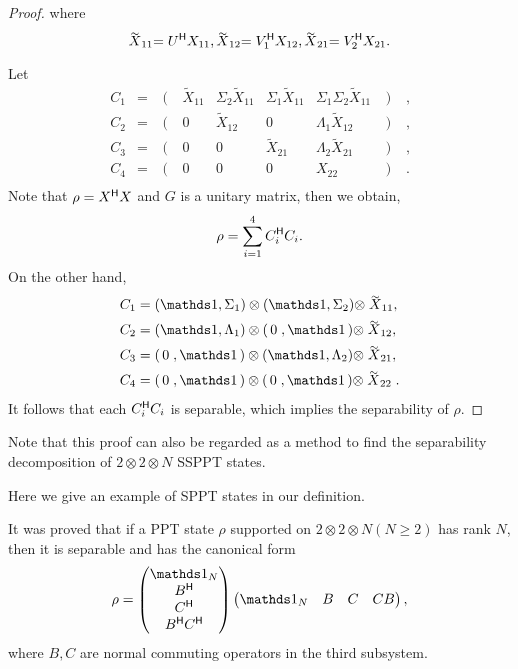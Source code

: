 \begin{proof}
  where
  \begin{equation}
    \label{eq:23p}
    \tilde X_{11} =  \adj U X_{11}, \tilde X_{12} =  \adj V_1 X_{12}, \tilde X_{21} =  \adj V_2 X_{21}.   
  \end{equation}
  
  Let
  \begin{equation*}
    \begin{array}{rclcccccrl}
      C_1 & = &\left(\right. &\tilde X_{11} &   \Sigma_2\tilde X_{11} & \Sigma_1 \tilde X_{11} & \Sigma_1\Sigma_{2} \tilde X_{11}&\left.\right)&, \\
      C_2 & = &\left(\right. &  0 &  \tilde X_{12} & 0 &  \Lambda_1 \tilde X_{12}&\left.\right)&,\\
      C_3 & = & \left(\right. &  0 & 0 &  \tilde X_{21} &   \Lambda_2\tilde X_{21}&\left.\right)&,\\
      C_4 & = & \left( \right.& 0 & 0 & 0 & X_{22}&\left.\right)&.\\
    \end{array}
  \end{equation*}
 Note that $\rho = X^{\mathsf{H}} X$ and $G$ is a unitary matrix,  then  we obtain,
  \begin{equation*}
    \rho = \sum_{i=1}^4C^{\mathsf{H}}_i C_i.
  \end{equation*}
  On the other hand,
  \begin{equation*}
    \begin{split}
      C_1 &= (\I,\Sigma_1)\otimes (\I,\Sigma_2) \otimes \tilde X_{11},\\
      C_2 & = (\I,\Lambda_1)\otimes (\,0\;,\I\,) \otimes \tilde X_{12},\\
      C_3 & = (\,0\;,\I\,)\otimes (\I,\Lambda_2) \otimes \tilde X_{21},\\
      C_4 &= (\,0\;,\I\,)\otimes (\,0\;,\I\,) \otimes \tilde X_{22}.
    \end{split}
  \end{equation*}
  It follows that each $C^{\mathsf{H}}_i C_i$ is separable, which implies the separability of $\rho$.
\end{proof}
  Note that this proof can also be regarded as a method to
  find the separability  decomposition of   $2\otimes 2\otimes N$ SSPPT states.

  Here we give an example of SPPT states in our definition.
  \begin{example}
     It was proved that if a PPT state  $\rho$ supported on $2\otimes 2\otimes N (N\geqslant 2)$ 
 has  rank $N $, then it  is separable and has the canonical form~\cite{Karnas2001}
 \begin{equation}
   \label{multiSPPTv0.6:eq:2}
   \rho = 
   \begin{pmatrix}
     \I_{N} \\ \adj B \\\adj C \\\adj B \adj C
   \end{pmatrix}
   \begin{pmatrix}
     \I_{N} & B & C & CB
   \end{pmatrix},
\end{equation}
where $B,C$ are normal commuting operators in the third subsystem.
  \end{example}

